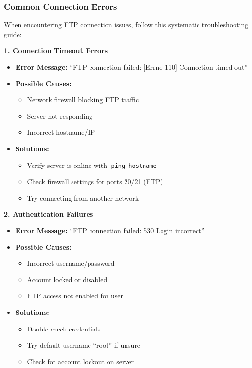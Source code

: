 \documentclass[a4paper,11pt]{report}
\begin{document}
\subsubsection{Common Connection Errors}
\begin{procedurebox}
When encountering FTP connection issues, follow this systematic troubleshooting guide:

\textbf{1. Connection Timeout Errors}
\begin{itemize}
    \item \textbf{Error Message:} ``FTP connection failed: [Errno 110] Connection timed out''
    \item \textbf{Possible Causes:}
    \begin{itemize}
        \item Network firewall blocking FTP traffic
        \item Server not responding
        \item Incorrect hostname/IP
    \end{itemize}
    \item \textbf{Solutions:}
    \begin{itemize}
        \item Verify server is online with: \verb|ping hostname|
        \item Check firewall settings for ports 20/21 (FTP)
        \item Try connecting from another network
    \end{itemize}
\end{itemize}

\textbf{2. Authentication Failures}
\begin{itemize}
    \item \textbf{Error Message:} ``FTP connection failed: 530 Login incorrect''
    \item \textbf{Possible Causes:}
    \begin{itemize}
        \item Incorrect username/password
        \item Account locked or disabled
        \item FTP access not enabled for user
    \end{itemize}
    \item \textbf{Solutions:}
    \begin{itemize}
        \item Double-check credentials
        \item Try default username ``root'' if unsure
        \item Check for account lockout on server
    \end{itemize}
\end{itemize}


\end{procedurebox}
\end{document}
